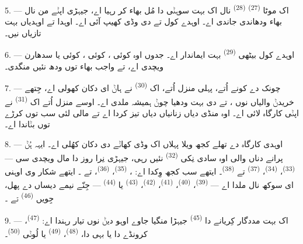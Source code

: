 5. --- اک موٹا  \textsuperscript{(27)} 
\textsuperscript{(28)} نال اک بہت سوہݨی  دا مُل بھاء کر رہیا اے، جیہڑی
اپݨے من نال بھاء ودھاندی جاندی اے۔ اوہدے کول  تے
 دی وڈی کھیپ آئی اے۔ اوہدا  تے اوہدیاں 
بہت تازیاں نیں۔

\VUsaut{4.0mm}
\VUsaut{3.0mm}

6. --- اوہدے کول بیٹھی  \textsuperscript{(29)} بہت ایماندار
اے۔ جدوں اوہ کوئی ، کوئی ، کوئی  یا سدھارن
 ویچدی اے، تے واجب بھاء توں ودھ نئیں منگدی۔

7. --- چونک دے کونے اُتے، پہلی منزل اُتے، اک 
\textsuperscript{(30)} نے ہاݨ ای دکان کھولی اے، جِتھے خریدݨ والیاں نوں
،  تے  دی بہت ودھیا چوݨ ہمیشہ
ملدی اے۔ اوسے منزل اُتے اک  \textsuperscript{(31)} نے اپݨی
کارگاہ لائی اے۔ اوہ منڈی دیاں زنانیاں دیاں  تیز کردا اے تے مالی لئی
سب توں کرڑے  توں  بݨاندا اے۔

\VUsaut{4.0mm}
\VUsaut{3.0mm}

8. --- اوہدی کارگاہ دے تھلے کجھ ویلا پہلاں اک وڈی کھاݨے دی دکان کھُلی اے۔ ایہہ ہُݨ
پرانے دناں والی اوہ سادی نِکی  \textsuperscript{(32)} نئیں
رہی، جیہڑی نِرا روز دا مال ویچدی سی —  \textsuperscript{(33)}،
 \textsuperscript{(34)}،  \textsuperscript{(37)} تے
 \textsuperscript{(38)}۔ ایتھے سب کجھ وِکدا اے:
،  \textsuperscript{(35)}،
 \textsuperscript{(36)}،  تے
۔ ایتھے شکار وی اوہنی ای سوکھ نال ملدا اے — 
\textsuperscript{(39)}،  \textsuperscript{(40)}، 
\textsuperscript{(41)}،  \textsuperscript{(42)}، 
\textsuperscript{(43)} یا  \textsuperscript{(44)} — جِنّے نیمے
دیساں دے پھل، جِویں  \textsuperscript{(46)} تے ۔

9. --- اک بہت مددگار کِریانے دا  \textsuperscript{(45)} جیہڑا منگیا
جاوے اوہو دیݨ نوں تیار رہندا اے:  \textsuperscript{(47)}، کرونڈے دا یا
بہی دا،  \textsuperscript{(48)}،  \textsuperscript{(49)} یا
لُوݨی  \textsuperscript{(50)}۔

